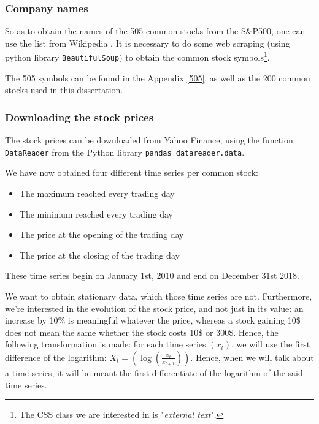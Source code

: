 \documentclass[11pt]{article}
\newcommand{\code}[1]{\colorbox{light-gray}{\texttt{#1}}}
\begin{document}
\begin{onehalfspace}
\subsubsection{Company names}

So as to obtain the names of the 505 common stocks from the S\&P500, one can use the list from Wikipedia \cite{500names}. It is necessary to do some web scraping (using python library \code{BeautifulSoup}) to obtain the common stock symbols\footnote{The CSS class we are interested in is "\textit{external text}".}. 

The 505 symbols can be found in the Appendix \ref{505}, as well as the 200 common stocks used in this dissertation. 

\subsubsection{Downloading the stock prices}

The stock prices can be downloaded from Yahoo Finance, using the function \code{DataReader} from the Python library \code{pandas\_datareader.data}.

We have now obtained four different time series per common stock:

\begin{itemize}
    \item The maximum reached every trading day
    \item The minimum reached every trading day
    \item The price at the opening of the trading day
    \item The price at the closing of the trading day
\end{itemize}

These time series begin on January 1st, 2010 and end on December 31st 2018.

We want to obtain stationary data\cite{stationary}, which those time series are not. Furthermore, we're interested in the evolution of the stock price, and not just in its value: an increase by 10\% is meaningful whatever the price, whereas a stock gaining 10\$ does not mean the same whether the stock costs 10\$ or 300\$. Hence, the following transformation is made: for each time series $(x_t)$, we will use the first difference of the logarithm: $X_t = \left(\log\left(\frac{x_t}{x_{t+1}}\right)\right)$. Hence, when we will talk about a time series, it will be meant the first differentiate of the logarithm of the said time series.


\end{onehalfspace}
\end{document}
